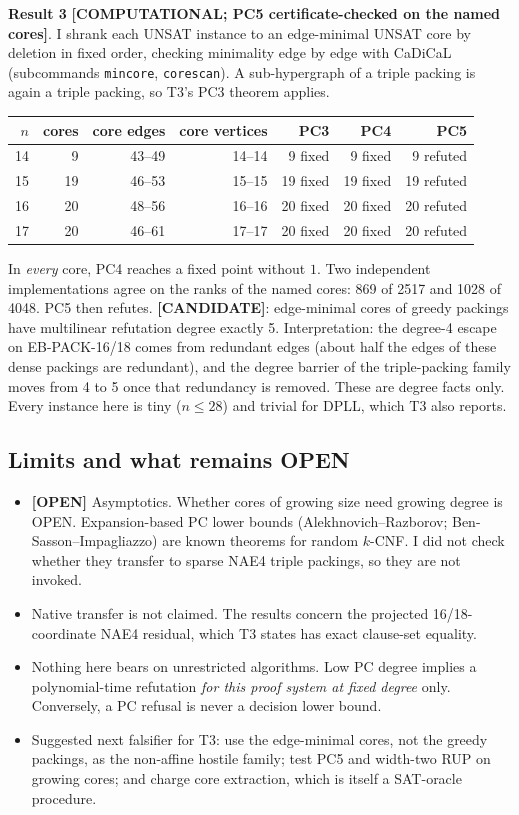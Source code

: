 \documentclass[11pt]{article}
\theoremstyle{remark}
\newcommand{\lab}[1]{\textbf{[#1]}}
\begin{document}
\textbf{Result 3} \lab{COMPUTATIONAL; PC5 certificate-checked on the named cores}. I shrank
each UNSAT instance to an edge-minimal UNSAT core by deletion in fixed order, checking
minimality edge by edge with CaDiCaL (subcommands \texttt{mincore}, \texttt{corescan}). A
sub-hypergraph of a triple packing is again a triple packing, so T3's PC3 theorem applies.
\begin{center}
\begin{tabular}{rrrrrrr}
\toprule
$n$ & cores & core edges & core vertices & PC3 & PC4 & PC5\\
\midrule
14 & 9 & 43--49 & 14--14 & 9 fixed & 9 fixed & 9 refuted\\
15 & 19 & 46--53 & 15--15 & 19 fixed & 19 fixed & 19 refuted\\
16 & 20 & 48--56 & 16--16 & 20 fixed & 20 fixed & 20 refuted\\
17 & 20 & 46--61 & 17--17 & 20 fixed & 20 fixed & 20 refuted\\
\bottomrule
\end{tabular}

\end{center}
In \emph{every} core, PC4 reaches a fixed point without $1$. Two independent implementations
agree on the ranks of the named cores: 869 of 2517 and 1028 of 4048. PC5 then refutes.
\lab{CANDIDATE}: edge-minimal cores of greedy packings have multilinear refutation degree
exactly 5. Interpretation: the degree-4 escape on EB-PACK-16/18 comes from redundant edges
(about half the edges of these dense packings are redundant), and the degree barrier of the
triple-packing family moves from 4 to 5 once that redundancy is removed. These are degree
facts only. Every instance here is tiny ($n\le 28$) and trivial for DPLL, which T3 also
reports.

\subsection{Limits and what remains OPEN}
\begin{itemize}
\item \lab{OPEN} Asymptotics. Whether cores of growing size need growing degree is OPEN.
Expansion-based PC lower bounds (Alekhnovich--Razborov; Ben-Sasson--Impagliazzo) are known
theorems for random $k$-CNF. I did not check whether they transfer to sparse NAE4 triple
packings, so they are not invoked.
\item Native transfer is not claimed. The results concern the projected 16/18-coordinate NAE4
residual, which T3 states has exact clause-set equality.
\item Nothing here bears on unrestricted algorithms. Low PC degree implies a polynomial-time
refutation \emph{for this proof system at fixed degree} only. Conversely, a PC refusal is
never a decision lower bound.
\item Suggested next falsifier for T3: use the edge-minimal cores, not the greedy packings, as
the non-affine hostile family; test PC5 and width-two RUP on growing cores; and charge core
extraction, which is itself a SAT-oracle procedure.
\end{itemize}
\end{document}
